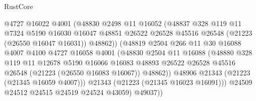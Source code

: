 \begin{lexlean}{RustCore}
\begin{coremodule}
                              @4727
                              @16022
                              @4001
                              (@48830
                                @2498
                                @11
                                @16052
                                (@48837
                                  @328
                                  @119
                                  @11
                                  @7324
                                  @5190
                                  @16030
                                  @16047
                                  @48851
                                  @26522
                                  @26528
                                  @45516
                                  @26548
                                  (@21223 (@26550 @16047 @16031))
                                  @48862))
                              (@48819
                                @2504
                                @266
                                @11
                                @30
                                @16088
                                @4007
                                @4100
                                @4727
                                @16058
                                @4001
                                (@48830
                                  @2504
                                  @11
                                  @16088
                                  (@48880
                                    @328
                                    @119
                                    @11
                                    @12678
                                    @5190
                                    @16066
                                    @16083
                                    @48893
                                    @26522
                                    @26528
                                    @45516
                                    @26548
                                    (@21223 (@26550 @16083 @16067))
                                    @48862))
                                @48906
                                @21343
                                (@21223 (@21345 @16059 @4007)))
                              @21343
                              (@21223 (@21345 @16023 @16091)))
                            @24509
                            @24512
                            @24515
                            @24519
                            @24524
                            @43059)
                          @49037))

\end{coremodule}
\end{lexlean}
